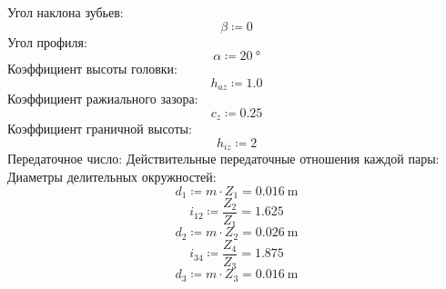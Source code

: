 \documentclass{article}
\newcommand{\defeq}{\coloneq} %
\begin{document}
\colorbox[HTML]{000000}{Угол наклона зубьев:}\newline
\begin{equation*}
{\beta} \defeq 0
\end{equation*}
\colorbox[HTML]{000000}{Угол профиля:}\newline
\begin{equation*}
{\alpha} \defeq 20 \: \mathrm{°}
\end{equation*}
\colorbox[HTML]{000000}{Коэффициент высоты головки:}\newline
\begin{equation*}
h_{az} \defeq 1.0
\end{equation*}
\colorbox[HTML]{000000}{Коэффициент ражиального зазора:}\newline
\begin{equation*}
c_{z} \defeq 0.25
\end{equation*}
\colorbox[HTML]{000000}{Коэффициент граничной высоты:}\newline
\begin{equation*}
h_{iz} \defeq 2
\end{equation*}
\colorbox[HTML]{000000}{Передаточное число:}\newline
\colorbox[HTML]{000000}{Действительные передаточные \newline
отношения каждой пары:}\newline
\colorbox[HTML]{000000}{Диаметры делительных окружностей:}\newline
\begin{equation*}
\textit{d}_{\textit{1}} \defeq m \cdot \textit{Z}_{\textit{1}} = {0.016 \: \mathrm{m}}
\end{equation*}
\begin{equation*}
\textit{i}_{\textit{12}} \defeq \frac{\textit{Z}_{\textit{2}}}{\textit{Z}_{\textit{1}}} = {1.625}
\end{equation*}
\begin{equation*}
\textit{d}_{\textit{2}} \defeq m \cdot \textit{Z}_{\textit{2}} = {0.026 \: \mathrm{m}}
\end{equation*}
\begin{equation*}
\textit{i}_{\textit{34}} \defeq \frac{\textit{Z}_{\textit{4}}}{\textit{Z}_{\textit{3}}} = {1.875}
\end{equation*}
\begin{equation*}
\textit{d}_{\textit{3}} \defeq m \cdot \textit{Z}_{\textit{3}} = {0.016 \: \mathrm{m}}
\end{equation*}
\end{document}

